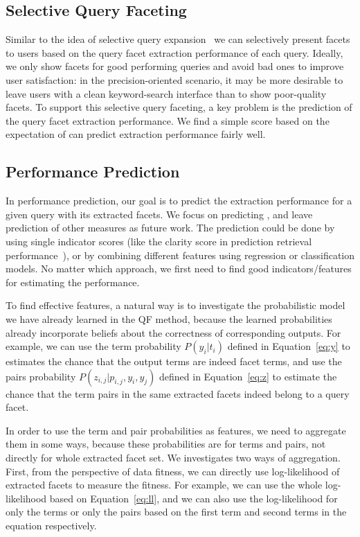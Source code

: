 \subsection{Selective Query Faceting}
Similar to the idea of selective query expansion~\cite{cronen2004framework,amati2004query,yom2005learning} we can selectively present facets to users based on the query facet extraction performance of each query. Ideally, we only show facets for good performing queries and avoid bad ones to improve user satisfaction: in the precision-oriented scenario, it may be more desirable to leave users with a clean keyword-search interface than to show poor-quality facets. To support this selective query faceting, a key problem is the prediction of the query facet extraction performance. We find a simple score based on the expectation of \PRF can predict extraction performance fairly well.

\subsection{Performance Prediction}
In performance prediction, our goal is to predict the extraction performance for a given query with its extracted facets. We focus on predicting \PRF, and leave prediction of other measures as future work. The prediction could be done by using single indicator scores (like the clarity score in prediction retrieval performance~\cite{cronen2002predicting}), or by combining different features using regression or classification models. No matter which approach, we first need to find good indicators/features for estimating the performance. 

To find effective features, a natural way is to investigate the probabilistic model we have already learned in the QF method, because the learned probabilities already incorporate beliefs about the correctness of corresponding outputs. For example, we can use the term probability $P(y_i|t_i)$ defined in Equation~\ref{eq:y} to estimates the chance that the output terms are indeed facet terms, and use the pairs probability $P(z_{i,j}|p_{i,j},y_i,y_j)$ defined in Equation~\ref{eq:z} to estimate the chance that the term pairs in the same extracted facets indeed belong to a query facet. 

In order to use the term and pair probabilities as features, we need to aggregate them in some ways, because these probabilities are for terms and pairs, not directly for whole extracted facet set. We investigates two ways of aggregation. First, from the perspective of data fitness, we can directly use log-likelihood of extracted facets to measure the fitness. For example, we can use the whole log-likelihood based on Equation~\ref{eq:ll}, and we can also use the log-likelihood for only the terms or only the pairs based on the first term and second terms in the equation respectively. 

